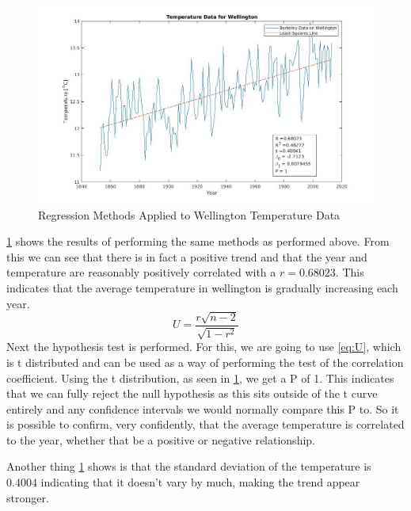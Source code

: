 \documentclass[a4paper, 12pt]{article}
\begin{document}
        \begin{figure}[!ht]
            \centering
            \includegraphics[width=\columnwidth]{regression.jpg}
            \caption{Regression Methods Applied to Wellington Temperature Data}
            \label{fig:regression}
        \end{figure}
        \cref{fig:regression} shows the results of performing the same methods as performed above. From this we can see that there is in fact a positive trend and that the year and temperature are reasonably positively correlated with a $r = 0.68023$. This indicates that the average temperature in wellington is gradually increasing each year.
        \begin{equation}
            \label{eq:U}
            U = \frac{r\sqrt{n-2}}{\sqrt{1-r^2}}
        \end{equation}
        Next the hypothesis test is performed. For this, we are going to use \cref{eq:U}, which is t distributed and can be used as a way of performing the test of the correlation coefficient. Using the t distribution, as seen in \cref{fig:regression}, we get a P of 1. This indicates that we can fully reject the null hypothesis as this sits outside of the t curve entirely and any confidence intervals we would normally compare this P to. So it is possible to confirm, very confidently, that the average temperature is correlated to the year, whether that be a positive or negative relationship.
        \par
        Another thing \cref{fig:regression} shows is that the standard deviation of the temperature is $0.4004$ indicating that it doesn't vary by much, making the trend appear stronger. 
\end{document}

